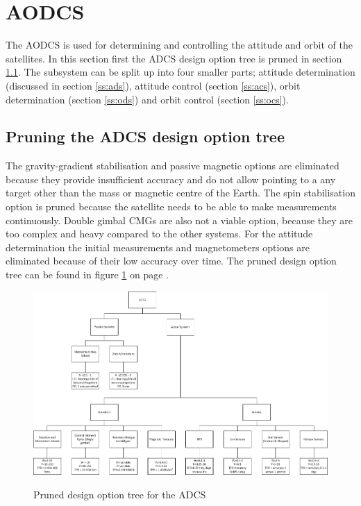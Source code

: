 \section{\ac{AODCS}}
The \ac{AODCS} is used for determining and controlling the attitude and orbit of the satellites. In this section first the \ac{ADCS} design option tree is pruned in section \ref{pruneADCS}. The subsystem can be split up into four smaller parts; attitude determination (discussed in section \ref{ss:ads}), attitude control (section \ref{ss:acs}), orbit determination (section \ref{ss:ods}) and orbit control (section \ref{ss:ocs}). 

\subsection{Pruning the \acs{ADCS} design option tree}
\label{pruneADCS}
The gravity-gradient stabilisation and passive magnetic options are eliminated because they provide insufficient accuracy and do not allow pointing to a any target other than the mass or magnetic centre of the Earth. The spin stabilisation option is pruned because the satellite needs to be able to make measurements continuously. Double gimbal \acp{CMG} are also not a viable option, because they are too complex and heavy compared to the other systems.
For the attitude determination the initial measurements and magnetometers options are eliminated because of their low accuracy over time.
The pruned design option tree can be found in figure \ref{fig:pruneADCS} on page \pageref{fig:pruneADCS}.

\begin{figure}
\centering
\includegraphics[width=1.0\textwidth, angle=90, bb =0 0 1009px 630px]{img/prunedADCStree.png}
\label{fig:pruneADCS}
\caption{Pruned design option tree for the \acs{ADCS}}
\end{figure}

